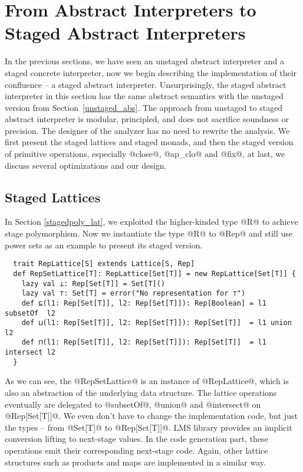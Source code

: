 \section{From Abstract Interpreters to Staged Abstract Interpreters} \label{sai}

In the previous sections, we have seen an unstaged abstract interpreter and a
staged concrete interpreter, now we begin describing the implementation of their
confluence -- a staged abstract interpreter.
Unsurprisingly, the staged abstract interpreter in this section has the same
abstract semantics with the unstaged version from Section~\ref{unstaged_abs}.
The approach from unstaged to staged abstract interpreter is modular,
principled, and does not sacrifice soundness or precision. The designer of the
analyzer has no need to rewrite the analysis. We first present the staged
lattices and staged monads, and then the staged version of primitive operations,
especially @close@, @ap_clo@ and @fix@, at last, we discuss several optimizations
and our design.

\subsection{Staged Lattices}

In Section \ref{stagedpoly_lat}, we exploited the higher-kinded type @R@ to
achieve stage polymorphism. Now we instantiate the type @R@ to @Rep@ and
still use power sets as an example to present its staged version.

\begin{lstlisting}
  trait RepLattice[S] extends Lattice[S, Rep]
  def RepSetLattice[T]: RepLattice[Set[T]] = new RepLattice[Set[T]] {
    lazy val ⊥: Rep[Set[T]] = Set[T]()
    lazy val ⊤: Set[T] = error("No representation for ⊤")
    def ⊑(l1: Rep[Set[T]], l2: Rep[Set[T]]): Rep[Boolean] = l1 subsetOf  l2
    def ⊔(l1: Rep[Set[T]], l2: Rep[Set[T]]): Rep[Set[T]]  = l1 union     l2
    def ⊓(l1: Rep[Set[T]], l2: Rep[Set[T]]): Rep[Set[T]]  = l1 intersect l2
  }
\end{lstlisting}

As we can see, the @RepSetLattice@ is an instance of @RepLattice@, which is also
an abstraction of the underlying data structure. The lattice operations
eventually are delegated to @subsetOf@, @union@ and @intersect@ on
@Rep[Set[T]]@. We even don't have to change the implementation code, but just
the types – from @Set[T]@ to @Rep[Set[T]]@. LMS library provides an implicit
conversion lifting to next-stage values. In the code generation part, these
operations emit their corresponding next-stage code. Again, other lattice
structures such as products and maps are implemented in a similar way.

